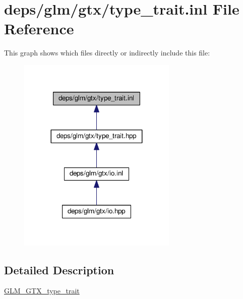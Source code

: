 \hypertarget{type__trait_8inl}{}\section{deps/glm/gtx/type\+\_\+trait.inl File Reference}
\label{type__trait_8inl}
This graph shows which files directly or indirectly include this file\+:
\nopagebreak
\begin{figure}[H]
\begin{center}
\leavevmode
\includegraphics[width=215pt]{de/d63/type__trait_8inl__dep__incl}
\end{center}
\end{figure}


\subsection{Detailed Description}
\hyperlink{group__gtx__type__trait}{G\+L\+M\+\_\+\+G\+T\+X\+\_\+type\+\_\+trait} 